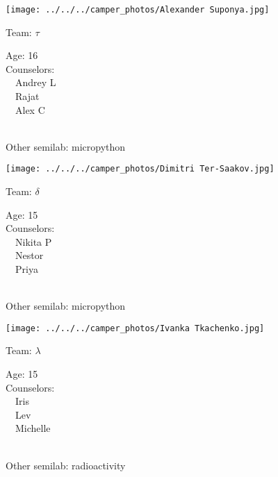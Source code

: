 \documentclass[10pt,letterpaper, landscape]{article}
\begin{document}
\horizontalshiftfornextsticker
\renewcommand{\baselinestretch}{1} \begin{sticker}
\noindent\begin{minipage}{0.5\textwidth}\texttt{[image: ../../../camper\_photos/Alexander Suponya.jpg]}\end{minipage}\begin{minipage}{0.45\textwidth}
Team: {\Large $\tau$}

Age:        16\\
Counselors: \\\ \ Andrey L\\\ \ Rajat\\\ \ Alex C\\
\end{minipage} \\ \vspace{0.07in}
Other semilab: micropython
\end{sticker}
\horizontalshiftfornextsticker
\renewcommand{\baselinestretch}{1} \begin{sticker}
\noindent\begin{minipage}{0.5\textwidth}\texttt{[image: ../../../camper\_photos/Dimitri Ter-Saakov.jpg]}\end{minipage}\begin{minipage}{0.45\textwidth}
Team: {\Large $\delta$}

Age:        15\\
Counselors: \\\ \ Nikita P\\\ \ Nestor\\\ \ Priya\\
\end{minipage} \\ \vspace{0.07in}
Other semilab: micropython
\end{sticker}
\horizontalshiftfornextsticker
\renewcommand{\baselinestretch}{1} \begin{sticker}
\noindent\begin{minipage}{0.5\textwidth}\texttt{[image: ../../../camper\_photos/Ivanka Tkachenko.jpg]}\end{minipage}\begin{minipage}{0.45\textwidth}
Team: {\Large $\lambda$}

Age:        15\\
Counselors: \\\ \ Iris\\\ \ Lev\\\ \ Michelle\\
\end{minipage} \\ \vspace{0.07in}
Other semilab: radioactivity
\end{sticker}
\end{document}
